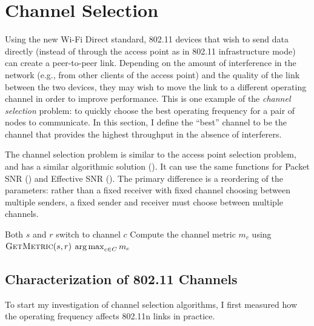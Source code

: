\section{Channel Selection}\label{sec:esnr_chansel}
Using the new Wi-Fi Direct standard, 802.11 devices that wish to send data directly (instead of through the access point as in 802.11 infrastructure mode) can create a peer-to-peer link. Depending on the amount of interference in the network (e.g., from other clients of the access point) and the quality of the link between the two devices, they may wish to move the link to a different operating channel in order to improve performance. This is one example of the \emph{channel selection} problem: to quickly choose the best operating frequency for a pair of nodes to communicate. In this section, I define the ``best'' channel to be the channel that provides the highest throughput in the absence of interferers.

The channel selection problem is similar to the access point selection problem, and has a similar algorithmic solution (). It can use the same  functions for Packet SNR () and Effective SNR (). The primary difference is a reordering of the parameters: rather than a fixed receiver with fixed channel choosing between multiple senders, a fixed sender and receiver must choose between multiple channels.

\begin{algorithm}[thp]
\caption{\label{alg:chan_sel_basic}}
\begin{algorithmic}[1]
\STATE Both $s$ and $r$ switch to channel $c$
\STATE Compute the channel metric $m_c$ using $\textsc{GetMetric}(s,r)$
\ENDFOR
\RETURN $\operatorname*{arg\,max}_{c\in C} m_c$ \hfill {}
\end{algorithmic}
\end{algorithm}

\subsection{Characterization of 802.11 Channels}
To start my investigation of channel selection algorithms, I first measured how the operating frequency affects 802.11n links in practice.

